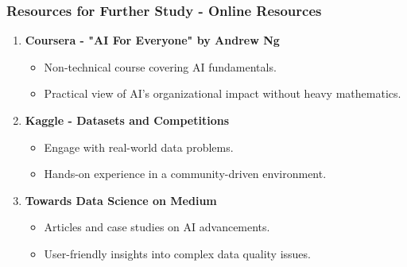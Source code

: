 \documentclass[aspectratio=169]{beamer}
\begin{document}
\begin{frame}[fragile]
    \frametitle{Resources for Further Study - Online Resources}
    \begin{enumerate}
        \item \textbf{Coursera - "AI For Everyone" by Andrew Ng}
        \begin{itemize}
            \item Non-technical course covering AI fundamentals.
            \item Practical view of AI's organizational impact without heavy mathematics.
        \end{itemize}
        
        \item \textbf{Kaggle - Datasets and Competitions}
        \begin{itemize}
            \item Engage with real-world data problems.
            \item Hands-on experience in a community-driven environment.
        \end{itemize}
        
        \item \textbf{Towards Data Science on Medium}
        \begin{itemize}
            \item Articles and case studies on AI advancements.
            \item User-friendly insights into complex data quality issues.
        \end{itemize}
    \end{enumerate}
\end{frame}
\end{document}

